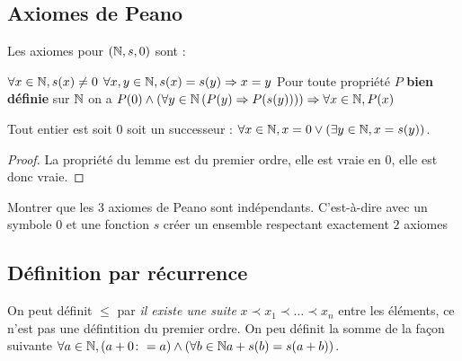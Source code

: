 \documentclass{report}
\begin{document}
\subsection*{Axiomes de Peano}

Les axiomes pour \(\left(\mathbb{N}, s, 0\right)\) sont :
\begin{enumerate}
    \itt \(\forall x\in\mathbb{N}, s(x)\neq 0\)
    \itt \(\forall x,y\in\mathbb{N}, s(x)=s(y)\Rightarrow x=y\)
    \itt Pour toute propriété \(P\) \textbf{bien définie} sur \(\mathbb{N}\) on a \(P(0)\land
    \left(\forall y\in\mathbb{N} \left(P(y)\Rightarrow P(s(y))\right)\right)\Rightarrow\forall x\in\mathbb{N},P(x)\)
\end{enumerate}


\begin{lemme}
    Tout entier est soit \(0\) soit un successeur :
    \(\forall x\in\mathbb{N}, x=0\lor (\exists y\in\mathbb{N}, x=s(y))\).
\end{lemme}
\begin{proof}
    La propriété du lemme est du premier ordre, elle est vraie en \(0\), elle est
    donc vraie.
\end{proof}

\begin{exo}
    Montrer que les \(3\) axiomes de Peano sont indépendants. C'est-à-dire avec un
    symbole \(0\) et une fonction \(s\) créer un ensemble respectant exactement
    \(2\) axiomes
\end{exo}

\subsection*{Définition par récurrence}

On peut définit \(\leq\) par \textit{il existe une suite} \(x\prec x_1\prec\dots\prec x_n\)
entre les éléments, ce n'est pas une défintition du premier ordre. On peu définit la
somme de la façon suivante \(\forall a\in\mathbb{N}, (a+0\colon=a)\land(\forall b\in\mathbb{N} a+s(b)=s(a+b))\).
\end{document}
